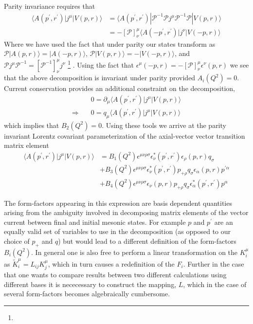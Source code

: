Parity invariance requires that 
\begin{align*}
\langle A(p^\prime,r^\prime) | j^\mu | V(p,r) \rangle &= \langle A(p^\prime,r^\prime) | \mathcal{P}^{-1} \mathcal{P} j^\mu \mathcal{P}^{-1} \mathcal{P}| V(p,r) \rangle \\
& = - \left[ \mathcal{P} \right]^\mu_\nu  \langle A(-p^\prime,r^\prime) | j^\nu | V(-p,r) \rangle
\end{align*} 
Where we have used the fact that under parity our states transform as $\mathcal{P} | A(p,r)\rangle = |A(-p,r)\rangle $, $\mathcal{P} | V(p,r)\rangle = -|V(-p,r)\rangle $, and $\mathcal{P} j^\mu\mathcal{P}^{-1}  = \left[ \mathcal{P}^{-1} \right]^\mu_\nu j^\nu$ \footnote{   } . Using the fact that $\epsilon^\mu(-p,r) = - \left[\mathcal{P}\right]^\mu_\nu \epsilon^\nu(p,r)$ we see that the above decomposition is invariant under parity provided $A_i(Q^2) =0$. 
Current conservation provides an additional constraint on the decomposition, 
\begin{align*} 
&0 = \partial_\mu \langle A(p^\prime,r^\prime) | j^\mu | V(p,r) \rangle \\
\Rightarrow \quad & 0 = q_\mu \langle A(p^\prime,r^\prime) | j^\mu | V(p,r) \rangle
\end{align*}
which implies that $B_2(Q^2) = 0$. Using these tools we arrive at the parity invariant Lorentz covariant parameterization of the axial-vector vector transition matrix element 
\begin{align*}
\langle A(p^\prime,r^\prime) |j^\mu | V(p,r) \rangle &= B_1(Q^2) \epsilon^{\mu\nu\rho\sigma}\epsilon^*_\nu(p^\prime,r^\prime)\epsilon_\rho(p,r)q_\sigma \\
& + B_3(Q^2) \epsilon^{\mu\nu\rho\sigma}\epsilon^*_\nu(p^\prime,r^\prime)p_{+\rho}q_\sigma \epsilon_\alpha(p,r)p^{\prime\alpha} \\
& + B_4(Q^2) \epsilon^{\mu\nu\rho\sigma}\epsilon_\nu(p,r)p_{+\rho}q_\sigma \epsilon^*_\alpha(p^\prime,r^\prime)p^\alpha
\end{align*}

The form-factors appearing in this expression are basis dependent quantities arising from the ambiguity involved in decomposing matrix elements of the vector current between final and initial mesonic states. For example $p$ and $p^\prime$ are an equally valid set of variables to use in the decomposition (as opposed to our choice of $p_+$ and $q$) but would lead to a different definition of the form-factors $B_i(Q^2)$. In general one is also free to perform a linear transformation on the $K^{\mu}_i$ as $\tilde{K}^\mu_i = L_{ij}K^\mu_j$, which in turn causes a redefinition of the $F_i$. Further in the case that one wants to compare results between two different calculations using different bases it is nececessary to construct the mapping, $L$, which in the case of several form-factors becomes algebraically cumbersome.

